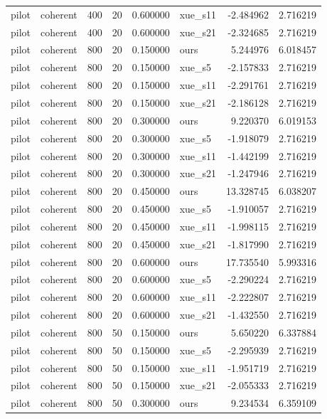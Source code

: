 \begin{longtable}{llrrrlrr}
pilot & coherent & 400 & 20 & 0.600000 & xue\_s11 & -2.484962 & 2.716219 \\
pilot & coherent & 400 & 20 & 0.600000 & xue\_s21 & -2.324685 & 2.716219 \\
pilot & coherent & 800 & 20 & 0.150000 & ours & 5.244976 & 6.018457 \\
pilot & coherent & 800 & 20 & 0.150000 & xue\_s5 & -2.157833 & 2.716219 \\
pilot & coherent & 800 & 20 & 0.150000 & xue\_s11 & -2.291761 & 2.716219 \\
pilot & coherent & 800 & 20 & 0.150000 & xue\_s21 & -2.186128 & 2.716219 \\
pilot & coherent & 800 & 20 & 0.300000 & ours & 9.220370 & 6.019153 \\
pilot & coherent & 800 & 20 & 0.300000 & xue\_s5 & -1.918079 & 2.716219 \\
pilot & coherent & 800 & 20 & 0.300000 & xue\_s11 & -1.442199 & 2.716219 \\
pilot & coherent & 800 & 20 & 0.300000 & xue\_s21 & -1.247946 & 2.716219 \\
pilot & coherent & 800 & 20 & 0.450000 & ours & 13.328745 & 6.038207 \\
pilot & coherent & 800 & 20 & 0.450000 & xue\_s5 & -1.910057 & 2.716219 \\
pilot & coherent & 800 & 20 & 0.450000 & xue\_s11 & -1.998115 & 2.716219 \\
pilot & coherent & 800 & 20 & 0.450000 & xue\_s21 & -1.817990 & 2.716219 \\
pilot & coherent & 800 & 20 & 0.600000 & ours & 17.735540 & 5.993316 \\
pilot & coherent & 800 & 20 & 0.600000 & xue\_s5 & -2.290224 & 2.716219 \\
pilot & coherent & 800 & 20 & 0.600000 & xue\_s11 & -2.222807 & 2.716219 \\
pilot & coherent & 800 & 20 & 0.600000 & xue\_s21 & -1.432550 & 2.716219 \\
pilot & coherent & 800 & 50 & 0.150000 & ours & 5.650220 & 6.337884 \\
pilot & coherent & 800 & 50 & 0.150000 & xue\_s5 & -2.295939 & 2.716219 \\
pilot & coherent & 800 & 50 & 0.150000 & xue\_s11 & -1.951719 & 2.716219 \\
pilot & coherent & 800 & 50 & 0.150000 & xue\_s21 & -2.055333 & 2.716219 \\
pilot & coherent & 800 & 50 & 0.300000 & ours & 9.234534 & 6.359109 \\

\end{longtable}
